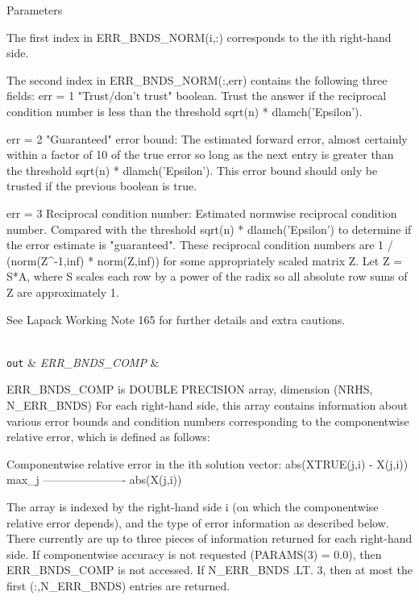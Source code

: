 \begin{DoxyParams}[1]{Parameters}
\begin{DoxyVerb}
     The first index in ERR_BNDS_NORM(i,:) corresponds to the ith
     right-hand side.

     The second index in ERR_BNDS_NORM(:,err) contains the following
     three fields:
     err = 1 "Trust/don't trust" boolean. Trust the answer if the
              reciprocal condition number is less than the threshold
              sqrt(n) * dlamch('Epsilon').

     err = 2 "Guaranteed" error bound: The estimated forward error,
              almost certainly within a factor of 10 of the true error
              so long as the next entry is greater than the threshold
              sqrt(n) * dlamch('Epsilon'). This error bound should only
              be trusted if the previous boolean is true.

     err = 3  Reciprocal condition number: Estimated normwise
              reciprocal condition number.  Compared with the threshold
              sqrt(n) * dlamch('Epsilon') to determine if the error
              estimate is "guaranteed". These reciprocal condition
              numbers are 1 / (norm(Z^{-1},inf) * norm(Z,inf)) for some
              appropriately scaled matrix Z.
              Let Z = S*A, where S scales each row by a power of the
              radix so all absolute row sums of Z are approximately 1.

     See Lapack Working Note 165 for further details and extra
     cautions.\end{DoxyVerb}
\\
\hline
\mbox{\tt out}  & {\em E\+R\+R\+\_\+\+B\+N\+D\+S\+\_\+\+C\+O\+M\+P} & \begin{DoxyVerb}          ERR_BNDS_COMP is DOUBLE PRECISION array, dimension (NRHS, N_ERR_BNDS)
     For each right-hand side, this array contains information about
     various error bounds and condition numbers corresponding to the
     componentwise relative error, which is defined as follows:

     Componentwise relative error in the ith solution vector:
                    abs(XTRUE(j,i) - X(j,i))
             max_j ----------------------
                         abs(X(j,i))

     The array is indexed by the right-hand side i (on which the
     componentwise relative error depends), and the type of error
     information as described below. There currently are up to three
     pieces of information returned for each right-hand side. If
     componentwise accuracy is not requested (PARAMS(3) = 0.0), then
     ERR_BNDS_COMP is not accessed.  If N_ERR_BNDS .LT. 3, then at most
     the first (:,N_ERR_BNDS) entries are returned.


\end{DoxyVerb}
\end{DoxyParams}
